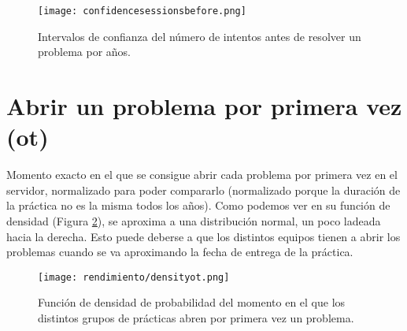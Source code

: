 \begin{figure}[H]
    \centering
    \texttt{[image: confidencesessionsbefore.png]}
    \caption{Intervalos de confianza del número de intentos antes de resolver un problema por años.}
    \label{fig:confidencesessionsbefore}
\end{figure}







\section{Abrir un problema por primera vez (ot)}

Momento exacto en el que se consigue abrir cada problema por primera vez en el servidor, normalizado para poder compararlo (normalizado porque la duración de la práctica no es la misma todos los años). Como podemos ver en su función de densidad (Figura \ref{fig:densityplotnewcomer}), se aproxima a una distribución normal, un poco ladeada hacia la derecha. Esto puede deberse a que los distintos equipos tienen a abrir los problemas cuando se va aproximando la fecha de entrega de la práctica.

\begin{figure}[H]
    \centering
    \texttt{[image: rendimiento/densityot.png]}
    \caption{Función de densidad de probabilidad del momento en el que los distintos grupos de prácticas abren por primera vez un problema.}
    \label{fig:densityplotnewcomer}
\end{figure}

